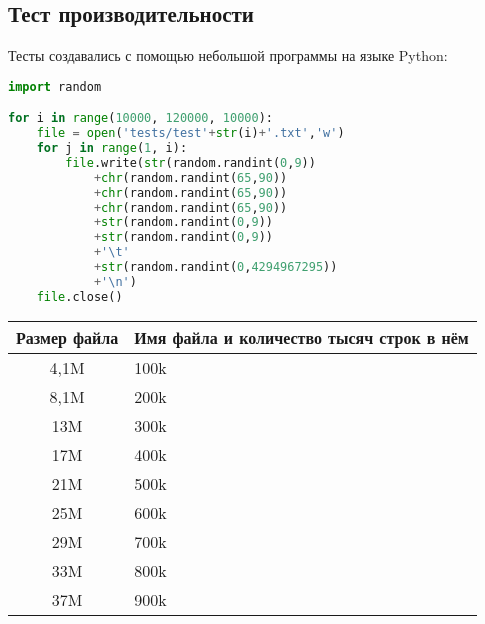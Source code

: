 \documentclass[12pt]{article}
\begin{document}
\subsection*{Тест производительности}
Тесты создавались с помощью небольшой программы на языке Python:
\begin{lstlisting}[language=python]
import random

for i in range(10000, 120000, 10000):
    file = open('tests/test'+str(i)+'.txt','w') 
    for j in range(1, i):
        file.write(str(random.randint(0,9))
            +chr(random.randint(65,90))
            +chr(random.randint(65,90))
            +chr(random.randint(65,90))
            +str(random.randint(0,9))
            +str(random.randint(0,9))
            +'\t'
            +str(random.randint(0,4294967295))
            +'\n')
    file.close()

\end{lstlisting}
\begin{table}
    \centering

\begin{tabular}{|c |m{5cm}|}
    \hline
    Размер файла& Имя файла и количество тысяч строк в нём\\ \hline
    4,1M&   100k\\
    
    8,1M&   200k\\
    
    13M &   300k\\
    
    17M &   400k\\
    
    21M &   500k\\
    
    25M &   600k\\
    
    29M &   700k\\
    
    33M &   800k\\
    
    37M &   900k\\ \hline
\end{tabular}
\end{table}

\end{document}
